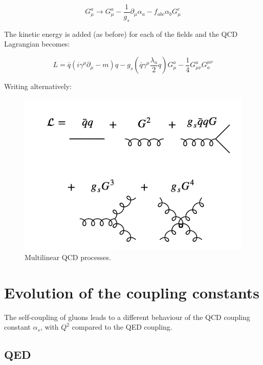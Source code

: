 \[
  G^a_{\mu} \to G^a_{\mu} - \frac{1}{g_s}\partial_{\mu}\alpha_a - f_{abc}\alpha_bG^c_{\mu}
\]

The kinetic energy is added (as before) for each of the fields and the QCD Lagrangian becomes:

\[
  L = \bar{q}\left(i\gamma^{\mu}\partial_{\mu} - m\right)q - g_s\left(\bar{q}\gamma^{\mu}\frac{\lambda_a}{2}q\right)G^a_{\mu} - \frac{1}{4}G^a_{\mu\nu}G_a^{\mu\nu}
\]

Writing alternatively:


\begin{figure}[!htb]
  \begin{center}
    \includegraphics[width=\textwidth]{images/web_feynman/image_79.png}
    \caption[Multilinear QCD processes]{Multilinear QCD processes.}
    \label{fig:ch15_trilinearQuadrilinearQCD}
  \end{center}
\end{figure}

\section{Evolution of the coupling constants}

The self-coupling of gluons leads to a different behaviour of the QCD coupling constant $\alpha_s$, with $Q^2$ compared to the QED coupling.

\subsection{QED}

